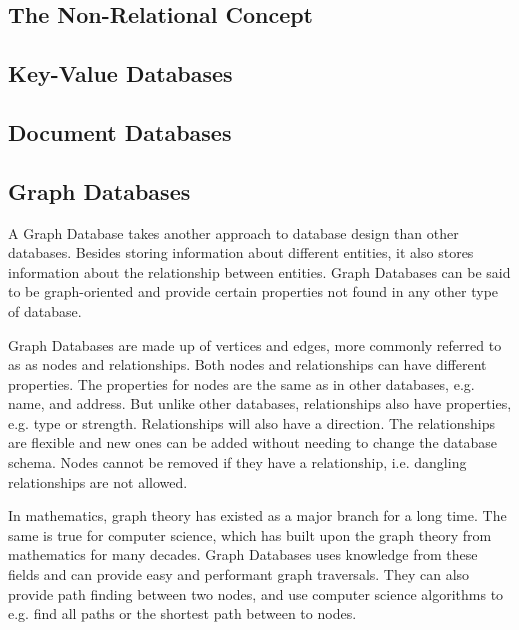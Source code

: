 
\subsection{The Non-Relational Concept}
\label{intro-nosql-concept}

\subsection{Key-Value Databases}
\label{intro-kv-db}

\subsection{Document Databases}
\label{intro-doc-db}

\subsection{Graph Databases}
\label{intro-graph-db}
A Graph Database takes another approach to database design than other databases. Besides storing information about different entities, it also stores information about the relationship between entities. Graph Databases can be said to be graph-oriented and provide certain properties not found in any other type of database.

Graph Databases are made up of vertices and edges, more commonly referred to as as nodes and relationships. Both nodes and relationships can have different properties. The properties for nodes are the same as in other databases, e.g. name, and address. But unlike other databases, relationships also have properties, e.g. type or strength. Relationships will also have a direction. The relationships are flexible and new ones can be added without needing to change the database schema. Nodes cannot be removed if they have a relationship, i.e. dangling relationships are not allowed.

In mathematics, graph theory has existed as a major branch for a long time. The same is true for computer science, which has built upon the graph theory from mathematics for many decades. Graph Databases uses knowledge from these fields and can provide easy and performant graph traversals. They can also provide path finding between two nodes, and use computer science algorithms to e.g. find all paths or the shortest path between to nodes.

